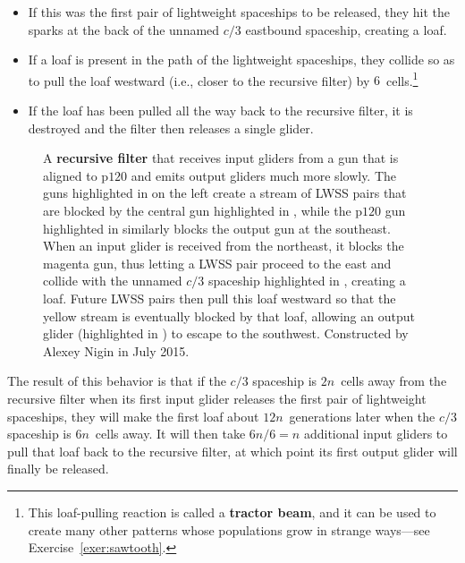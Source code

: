 \begin{itemize}
	\item[1)] If this was the first pair of lightweight spaceships to be released, they hit the sparks at the back of the unnamed $c/3$ eastbound spaceship, creating a loaf.\smallskip
	
	\item[2)] If a loaf is present in the path of the lightweight spaceships, they collide so as to pull the loaf westward (i.e., closer to the recursive filter) by $6$~cells.\footnote{This loaf-pulling reaction is called a \textbf{tractor beam}, and it can be used to create many other patterns whose populations grow in strange ways---see Exercise~\ref{exer:sawtooth}.}\smallskip
	
	\item[3)] If the loaf has been pulled all the way back to the recursive filter, it is destroyed and the filter then releases a single glider.\smallskip
\end{itemize}

\begin{figure}[!htb]
	\centering
	\caption{A \textbf{recursive filter} that receives input gliders from a gun that is aligned to p$120$ and emits output gliders much more slowly. The guns highlighted in  on the left create a stream of LWSS pairs that are blocked by the central gun highlighted in , while the p$120$ gun highlighted in  similarly blocks the output gun at the southeast. When an input glider is received from the northeast, it blocks the magenta gun, thus letting a LWSS pair proceed to the east and collide with the unnamed $c/3$ spaceship highlighted in , creating a loaf. Future LWSS pairs then pull this loaf westward so that the yellow stream is eventually blocked by that loaf, allowing an output glider (highlighted in ) to escape to the southwest. Constructed by Alexey Nigin in July 2015.}\label{fig:recursive_filter}
\end{figure}

The result of this behavior is that if the $c/3$ spaceship is $2n$~cells away from the recursive filter when its first input glider releases the first pair of lightweight spaceships, they will make the first loaf about $12n$~generations later when the $c/3$ spaceship is $6n$~cells away. It will then take $6n/6 = n$ additional input gliders to pull that loaf back to the recursive filter, at which point its first output glider will finally be released.

